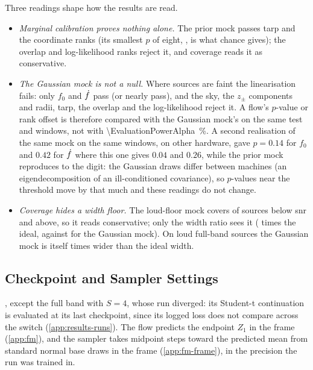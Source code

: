 Three readings shape how the results are read.
\begin{itemize}
  \item \emph{Marginal calibration proves nothing alone.} The prior mock passes \ac{tarp} and the coordinate ranks (its
    smallest $p$ of eight, \EvaluationMockPriorCoord, is what chance gives); the overlap and log-likelihood ranks reject
    it, and coverage reads it as conservative.
  \item \emph{The Gaussian mock is not a null.} Where sources are faint the linearisation fails: only $f_0$ and $\dot f$
    pass (or nearly pass), and the sky, the $z_\pm$ components and radii, \ac{tarp}, the overlap and the log-likelihood
    reject it. A flow's $p$-value or rank offset is therefore compared with the Gaussian mock's on the same test and
    windows, not with \qty{\EvaluationPowerAlpha}{\percent}.
    A second realisation of the same mock on the same windows, on other hardware, gave $p=0.14$ for $f_0$ and $0.42$ for
    $\dot f$ where this one gives $0.04$ and $0.26$, while the prior mock reproduces to the digit: the Gaussian draws differ
    between machines (an eigendecomposition of an ill-conditioned covariance), so $p$-values near the threshold move by that
    much and these readings do not change.
  \item \emph{Coverage hides a width floor.} The loud-floor mock covers \EvaluationMockFloorCoverQuiet{} of sources below
    \ac{snr} \EvaluationBandTwo{} and \EvaluationMockFloorCoverLoud{} above, so it reads conservative; only the width
    ratio sees it (\EvaluationMockFloorIdeal{} times the ideal, against \EvaluationMockFisherIdeal{} for the Gaussian mock).
    On loud full-band sources the Gaussian mock is itself \EvaluationMockFisherIdealFull{} times wider than the ideal width.
\end{itemize}

\subsection{Checkpoint and Sampler Settings}
\label{app:evaluation-weights}

, except the full band with $S=4$, whose run diverged: its Student-t continuation is evaluated at
its last checkpoint, since its logged loss does not compare across the switch (\cref{app:results-runs}).
The flow predicts the endpoint $Z_1$ in the frame (\cref{app:fm}), and the sampler takes \EvaluationOdeSteps{} midpoint
steps toward the predicted mean from standard normal base draws in the frame (\cref{app:fm-frame}), in the precision the
run was trained in.

